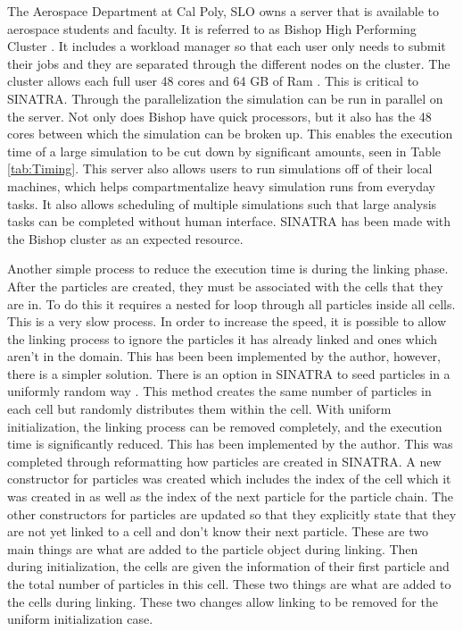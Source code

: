 \indent The Aerospace Department at Cal Poly, SLO owns a server that is available to aerospace students and faculty. It is referred to as Bishop High Performing Cluster \cite{hpc}. It includes a workload manager so that each user only needs to submit their jobs and they are separated through the different nodes on the cluster. The cluster allows each full user 48 cores and 64 GB of Ram \cite{hpc}. This is critical to SINATRA. Through the parallelization the simulation can be run in parallel on the server. Not only does Bishop have quick processors, but it also has the 48 cores between which the simulation can be broken up. This enables the execution time of a large simulation to be cut down by significant amounts, seen in Table \ref{tab:Timing}. This server also allows users to run simulations off of their local machines, which helps compartmentalize heavy simulation runs from everyday tasks. It also allows scheduling of multiple simulations such that large analysis tasks can be completed without human interface. SINATRA has been made with the Bishop cluster as an expected resource. \par

\indent Another simple process to reduce the execution time is during the linking phase. After the particles are created, they must be associated with the cells that they are in. To do this it requires a nested for loop  through all particles inside all cells. This is a very slow process. In order to increase the speed, it is possible to allow the linking process to ignore the particles it has already linked and ones which aren't in the domain. This has been been implemented by the author, however, there is a simpler solution. There is an option in SINATRA to seed particles in a uniformly random way \cite{Galvez2018a}. This method creates the same number of particles in each cell but randomly distributes them within the cell. With uniform initialization, the linking process can be removed completely, and the execution time is significantly reduced. This has been implemented by the author. This was completed through reformatting how particles are created in SINATRA. A new constructor for particles was created which includes the index of the cell which it was created in as well as the index of the next particle for the particle chain. The other constructors for particles are updated so that they explicitly state that they are not yet linked to a cell and don't know their next particle. These are two main things are what are added to the particle object during linking. Then during initialization, the cells are given the information of their first particle and the total number of particles in this cell. These two things are what are added to the cells during linking. These two changes allow linking to be removed for the uniform initialization case. \par

